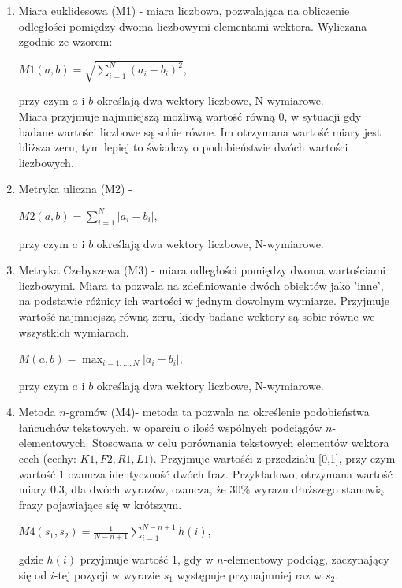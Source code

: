 \documentclass{classrep}
\begin{document}
\begin{enumerate}
  \item Miara euklidesowa (M1) - miara liczbowa, pozwalająca na obliczenie odległości pomiędzy dwoma liczbowymi elementami wektora. Wyliczana zgodnie ze wzorem:
  \begin{center}
    $M1(a, b) = \sqrt{\sum_{i=1}^{N}(a_i - b_i)^2}$,\\
  \end{center}
  przy czym $a$ i $b$ określają dwa wektory liczbowe, N-wymiarowe.\\
  Miara przyjmuje najmniejszą możliwą wartość równą 0, w sytuacji gdy badane wartości liczbowe są sobie równe.
  Im otrzymana wartość miary jest bliższa zeru, tym lepiej to świadczy o podobieństwie dwóch wartości liczbowych. \\
  \item Metryka uliczna (M2) - 
  \begin{center}
    $M2(a, b) = \sum_{i=1}^{N} |a_i - b_i|$, \\
  \end{center}
  przy czym $a$ i $b$ określają dwa wektory liczbowe, N-wymiarowe.\\
  \item Metryka Czebyszewa (M3) - miara odległości pomiędzy dwoma wartościami liczbowymi. Miara ta pozwala na zdefiniowanie dwóch obiektów jako 'inne', na podstawie różnicy ich wartości w jednym dowolnym wymiarze.
  Przyjmuje wartość najmniejszą równą zeru, kiedy badane wektory są sobie równe we wszystkich wymiarach. \\
  \begin{center}
    $M(a, b) = \max_{i=1, ..., N} |a_i - b_i|$, \\
  \end{center}
  przy czym $a$ i $b$ określają dwa wektory liczbowe, N-wymiarowe.\\
  \item Metoda \(n\)-gramów (M4)- metoda ta pozwala na określenie podobieństwa łańcuchów tekstowych, w oparciu o ilość wspólnych podciągów \(n\)-elementowych. Stosowana w celu porównania tekstowych elementów wektora cech (cechy: \(K1, F2, R1, L1)\). 
  Przyjmuje wartośći z przedziału [0,1], przy czym wartość 1 ozancza identyczność dwóch fraz. Przykładowo, otrzymana wartość miary 0.3, dla dwóch wyrazów, ozancza, że 30\% wyrazu dłuższego stanowią frazy pojawiające się w krótszym. \\ 
  \begin{center}
    $M4(s_1, s_2) = \frac{1}{N-n+1} \sum_{i=1}^{N-n+1} h(i)$,\\
  \end{center}
  gdzie \(h(i)\) przyjmuje wartość 1, gdy w \(n\)-elementowy podciąg, zaczynający się od \(i\)-tej pozycji w wyrazie \(s_1\) występuje przynajmniej raz w \(s_2\).
\end{enumerate} 
\end{document}
